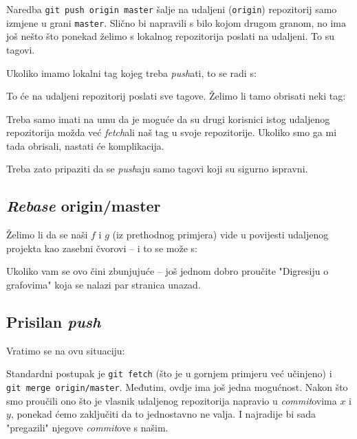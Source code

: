 Naredba \verb+git push origin master+ šalje na udaljeni (\verb+origin+) repozitorij samo izmjene u grani \verb+master+.
Slično bi napravili s bilo kojom drugom granom, no ima još nešto što ponekad želimo s lokalnog repozitorija poslati na udaljeni.
To su tagovi.

Ukoliko imamo lokalni tag kojeg treba \emph{push}ati, to se radi s:


To će na udaljeni repozitorij poslati sve tagove.
Želimo li tamo obrisati neki tag:


Treba samo imati na umu da je moguće da su drugi korisnici istog udaljenog repozitorija možda već \emph{fetch}ali naš tag u svoje repozitorije.
Ukoliko smo ga mi tada obrisali, nastati će komplikacija.

Treba zato pripaziti da se \emph{push}aju samo tagovi koji su sigurno ispravni.

\subsection*{\emph{Rebase} origin/master}

Želimo li da se naši $f$ i $g$ (iz prethodnog primjera) vide u povijesti udaljenog projekta kao zasebni čvorovi -- i to se može s:


Ukoliko vam se ovo čini zbunjujuće -- još jednom dobro proučite "Digresiju o grafovima" koja se nalazi par stranica unazad.

\subsection*{Prisilan \emph{push}}

Vratimo se na ovu situaciju:



Standardni postupak je \verb+git fetch+ (što je u gornjem primjeru već učinjeno) i \\ \verb+git merge origin/master+.
Međutim, ovdje ima još jedna mogućnost.
Nakon što smo proučili ono što je vlasnik udaljenog repozitorija napravio u \emph{commit}ovima $x$ i $y$, ponekad ćemo zaključiti da to jednostavno ne valja. 
I najradije bi sada "pregazili" njegove \emph{commit}ove s našim.

